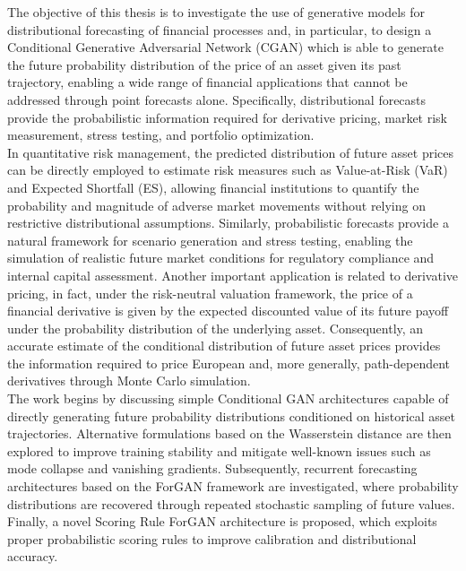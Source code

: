 The objective of this thesis is to investigate the use of generative models for distributional forecasting
of financial processes and, 
in particular, to design a Conditional Generative Adversarial Network (CGAN) which is able to generate 
the future probability distribution of the price of an asset given its past trajectory, enabling a wide range of financial applications that cannot be addressed through point forecasts alone.
Specifically, distributional forecasts provide the probabilistic information required for derivative pricing, market risk measurement, stress testing, and portfolio optimization.\\

In quantitative risk management, the predicted distribution of future asset prices 
can be directly employed to estimate risk measures such as Value-at-Risk (VaR) and Expected Shortfall (ES), 
allowing financial institutions to quantify the probability and magnitude of adverse market movements without relying on restrictive distributional assumptions.
Similarly, probabilistic forecasts provide a natural framework for scenario generation and stress testing, 
enabling the simulation of realistic future market conditions for regulatory compliance and internal capital assessment.
Another important application is related to derivative pricing, in fact, under the risk-neutral valuation framework, 
the price of a financial derivative is given by the expected discounted value of its future payoff under the probability distribution of the underlying asset. 
Consequently, an accurate estimate of the conditional distribution of future asset prices provides the information required to price European and, more generally, path-dependent derivatives through Monte Carlo simulation.\\

The work begins by discussing simple Conditional GAN architectures capable of directly generating future probability distributions conditioned on historical asset trajectories.
Alternative formulations based on the Wasserstein distance are then explored to improve training stability and mitigate well-known issues such as mode collapse and vanishing gradients. 
Subsequently, recurrent forecasting architectures based on the ForGAN framework are investigated, where probability distributions are recovered through repeated stochastic sampling of future values.
Finally, a novel Scoring Rule ForGAN architecture is proposed, which exploits proper probabilistic scoring rules to improve calibration and distributional accuracy.\\

